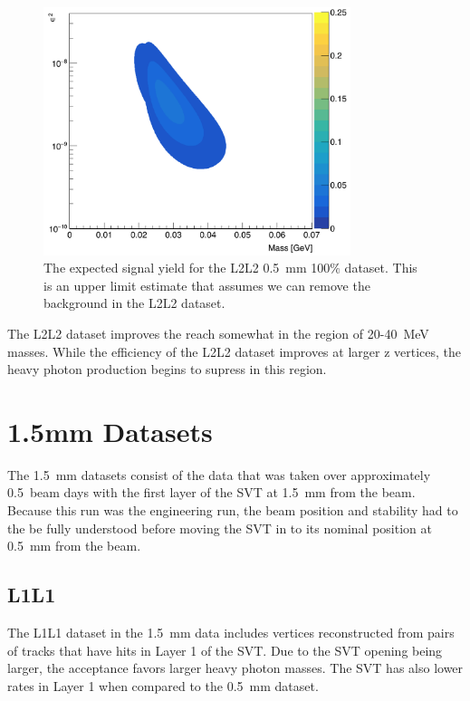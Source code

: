 \documentclass[twoside]{article}
\begin{document}
\begin{figure}[H]
  \centering
     \includegraphics[width=0.8\textwidth]{plots/reachL2L2.png}
  \caption{The expected signal yield for the L2L2 0.5~mm 100$\%$ dataset. This is an upper limit estimate that assumes we can remove the background in the L2L2 dataset. }
  \label{fig:reachL2L2}
\end{figure} 


The L2L2 dataset improves the reach somewhat in the region of 20-40~MeV masses. While the efficiency of the L2L2 dataset improves at larger z vertices, the heavy photon production begins to supress in this region. 


\section{1.5mm Datasets}
The 1.5~mm datasets consist of the data that was taken over approximately 0.5~beam days with the first layer of the SVT at 1.5~mm from the beam. Because this run was the engineering run, the beam position and stability had to the be fully understood before moving the SVT in to its nominal position at 0.5~mm from the beam.  

\subsection{L1L1}

The L1L1 dataset in the 1.5~mm data includes vertices reconstructed from pairs of tracks that have hits in Layer 1 of the SVT. Due to the SVT opening being larger, the acceptance favors larger heavy photon masses. The SVT has also lower rates in Layer 1 when compared to the 0.5~mm dataset.
\end{document}
